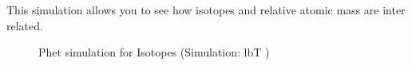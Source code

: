     \noindent
This simulation allows you to see how isotopes and relative atomic mass are inter related.
    \setcounter{subfigure}{0}
	\begin{figure}[H] %
    \textnormal{Phet simulation for Isotopes}\vspace{.1in} \nopagebreak
  \label{m38806*phet!!!underscore!!!sim}\label{m38806*phet-simulation}
             { (Simulation:  lbT )}
      \vspace{2pt}
    \vspace{.1in}
 \end{figure}           \par \label{m38753*secfhsst!!!underscore!!!id6128}
